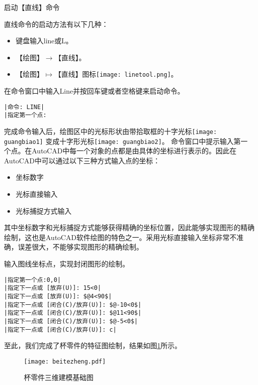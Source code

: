 \begin{procedure}
\item 启动【直线】命令

直线命令的启动方法有以下几种：
\begin{itemize}
\item 键盘输入line或L。
\item 【绘图】$\rightarrow$【直线】。
\item 【绘图】$\mapsto$【直线】图标\texttt{[image: linetool.png]}。
\end{itemize}
在命令窗口中输入Line并按回车键或者空格键来启动命令。
\begin{lstlisting}
|命令: LINE|
|指定第一个点:
\end{lstlisting}
完成命令输入后，绘图区中的光标形状由带拾取框的十字光标\texttt{[image: guangbiao1]} 变成十字形光标\texttt{[image: guangbiao2]}。
命令窗口中提示输入第一个点。在AutoCAD中每一个对象的点都是由具体的坐标进行表示的。因此在AutoCAD中可以通过以下三种方式输入点的坐标：
\begin{itemize}
\item 坐标数字
\item 光标直接输入
\item 光标捕捉方式输入
\end{itemize}

其中坐标数字和光标捕捉方式能够获得精确的坐标位置，因此能够实现图形的精确绘制，这也是AutoCAD软件绘图的特色之一。采用光标直接输入坐标非常不准确，误差很大，不能够实现图形的精确绘制。
\item 输入图线坐标点，实现封闭图形的绘制。

\begin{lstlisting}
|指定第一个点:0,0|
|指定下一点或 [放弃(U)]: 15<0|
|指定下一点或 [放弃(U)]: $@4<90$|
|指定下一点或 [闭合(C)/放弃(U)]: $@-10<0$|
|指定下一点或 [闭合(C)/放弃(U)]: $@11<90$|
|指定下一点或 [闭合(C)/放弃(U)]: $@-5<0$|
|指定下一点或 [闭合(C)/放弃(U)]: c|
\end{lstlisting}

至此，我们完成了杯零件的特征图绘制，结果如图\ref{fig:bettezheng}所示。
\noindent
\begin{figure}[htbp]
\centering
\texttt{[image: beitezheng.pdf]}
\caption{杯零件三维建模基础图}\label{fig:bettezheng}
\end{figure}
\end{procedure}

